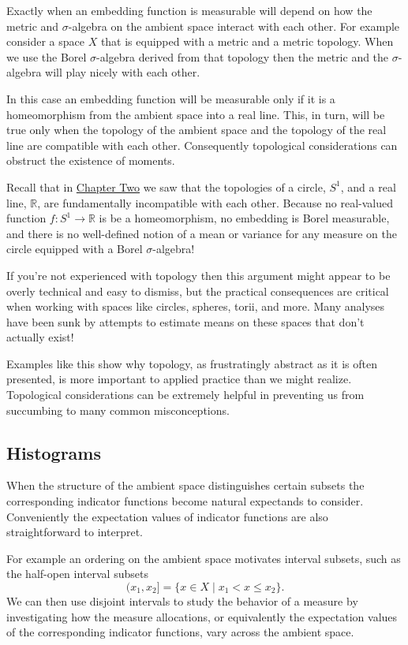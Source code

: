 \documentclass[
  letterpaper,
  DIV=11,
  numbers=noendperiod]{scrartcl}
\begin{document}
Exactly when an embedding function is measurable will depend on how the
metric and \(\sigma\)-algebra on the ambient space interact with each
other. For example consider a space \(X\) that is equipped with a metric
and a metric topology. When we use the Borel \(\sigma\)-algebra derived
from that topology then the metric and the \(\sigma\)-algebra will play
nicely with each other.

In this case an embedding function will be measurable only if it is a
homeomorphism from the ambient space into a real line. This, in turn,
will be true only when the topology of the ambient space and the
topology of the real line are compatible with each other. Consequently
topological considerations can obstruct the existence of moments.

Recall that in
\href{https://betanalpha.github.io/assets/chapters_html/spaces.html}{Chapter
Two} we saw that the topologies of a circle, \(S^{1}\), and a real line,
\(\mathbb{R}\), are fundamentally incompatible with each other. Because
no real-valued function \(f: S^{1} \rightarrow \mathbb{R}\) is be a
homeomorphism, no embedding is Borel measurable, and there is no
well-defined notion of a mean or variance for any measure on the circle
equipped with a Borel \(\sigma\)-algebra!

If you're not experienced with topology then this argument might appear
to be overly technical and easy to dismiss, but the practical
consequences are critical when working with spaces like circles,
spheres, torii, and more. Many analyses have been sunk by attempts to
estimate means on these spaces that don't actually exist!

Examples like this show why topology, as frustratingly abstract as it is
often presented, is more important to applied practice than we might
realize. Topological considerations can be extremely helpful in
preventing us from succumbing to many common misconceptions.

\hypertarget{histograms}{%
\subsection{Histograms}\label{histograms}}

When the structure of the ambient space distinguishes certain subsets
the corresponding indicator functions become natural expectands to
consider. Conveniently the expectation values of indicator functions are
also straightforward to interpret.

For example an ordering on the ambient space motivates interval subsets,
such as the half-open interval subsets \[
( x_{1}, x_{2} ] = \{ x \in X \mid x_{1} < x \le x_{2} \}.
\] We can then use disjoint intervals to study the behavior of a measure
by investigating how the measure allocations, or equivalently the
expectation values of the corresponding indicator functions, vary across
the ambient space.
\end{document}
